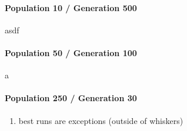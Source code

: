 		\paragraph{Population 10 / Generation 500}
			asdf
		
		\paragraph{Population 50 / Generation 100}
			a
		
		\paragraph{Population 250 / Generation 30}
		
			\begin{enumerate}
				\item best runs are exceptions (outside of whiskers)
			\end{enumerate}
			
